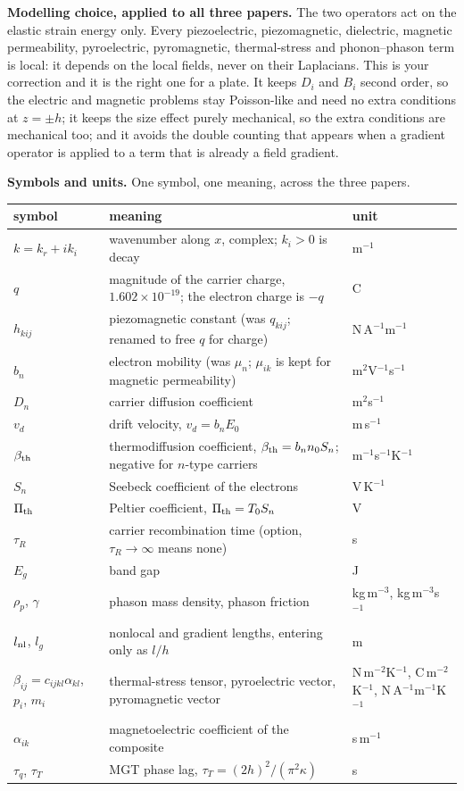 \documentclass[11pt]{article}
\begin{document}
\medskip
\noindent\textbf{Modelling choice, applied to all three papers.} The two operators act on the elastic
strain energy only. Every piezoelectric, piezomagnetic, dielectric, magnetic permeability, pyroelectric,
pyromagnetic, thermal-stress and phonon--phason term is local: it depends on the local fields, never on
their Laplacians. This is your correction and it is the right one for a plate. It keeps $D_i$ and $B_i$
second order, so the electric and magnetic problems stay Poisson-like and need no extra conditions at
$z=\pm h$; it keeps the size effect purely mechanical, so the extra conditions are mechanical too; and it
avoids the double counting that appears when a gradient operator is applied to a term that is already a
field gradient.

\medskip
\noindent\textbf{Symbols and units.} One symbol, one meaning, across the three papers.
\begin{center}\footnotesize
\begin{tabular}{p{2.3cm}p{6.4cm}p{4.9cm}}
\toprule
symbol & meaning & unit\\
\midrule
$k=k_r+ik_i$ & wavenumber along $x$, complex; $k_i>0$ is decay & m$^{-1}$\\
$q$ & magnitude of the carrier charge, $1.602\times10^{-19}$; the electron charge is $-q$ & C\\
$h_{kij}$ & piezomagnetic constant (was $q_{kij}$; renamed to free $q$ for charge) & N\,A$^{-1}$m$^{-1}$\\
$b_n$ & electron mobility (was $\mu_n$; $\mu_{ik}$ is kept for magnetic permeability) & m$^2$V$^{-1}$s$^{-1}$\\
$D_n$ & carrier diffusion coefficient & m$^2$s$^{-1}$\\
$v_d$ & drift velocity, $v_d=b_nE_0$ & m\,s$^{-1}$\\
$\beta_{\rm th}$ & thermodiffusion coefficient, $\beta_{\rm th}=b_nn_0S_n$; negative for $n$-type carriers & m$^{-1}$s$^{-1}$K$^{-1}$\\
$S_n$ & Seebeck coefficient of the electrons & V\,K$^{-1}$\\
$\Pi_{\rm th}$ & Peltier coefficient, $\Pi_{\rm th}=T_0S_n$ & V\\
$\tau_R$ & carrier recombination time (option, $\tau_R\to\infty$ means none) & s\\
$E_g$ & band gap & J\\
$\rho_p$, $\gamma$ & phason mass density, phason friction & kg\,m$^{-3}$, kg\,m$^{-3}$s$^{-1}$\\
$l_{\rm nl}$, $l_g$ & nonlocal and gradient lengths, entering only as $l/h$ & m\\
$\beta_{ij}=c_{ijkl}\alpha_{kl}$, $p_i$, $m_i$ & thermal-stress tensor, pyroelectric vector, pyromagnetic vector & N\,m$^{-2}$K$^{-1}$, C\,m$^{-2}$K$^{-1}$, N\,A$^{-1}$m$^{-1}$K$^{-1}$\\
$\alpha_{ik}$ & magnetoelectric coefficient of the composite & s\,m$^{-1}$\\
$\tau_q$, $\tau_T$ & MGT phase lag, $\tau_T=(2h)^2/(\pi^2\kappa)$ & s\\
\bottomrule
\end{tabular}
\end{center}
\end{document}
